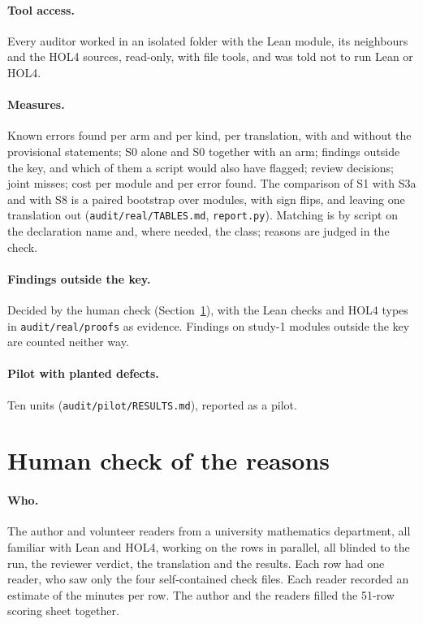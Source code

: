 \documentclass[11pt,a4paper]{article}
\newcommand{\code}[1]{\texttt{#1}}
\begin{document}
\paragraph{Tool access.} Every auditor worked in an isolated folder with the Lean module, its neighbours and the HOL4 sources, read-only, with file tools, and was told not to run Lean or HOL4.
\paragraph{Measures.} Known errors found per arm and per kind, per translation, with and without the provisional statements; S0 alone and S0 together with an arm; findings outside the key, and which of them a script would also have flagged; review decisions; joint misses; cost per module and per error found. The comparison of S1 with S3a and with S8 is a paired bootstrap over modules, with sign flips, and leaving one translation out (\code{audit/real/TABLES.md}, \code{report.py}). Matching is by script on the declaration name and, where needed, the class; reasons are judged in the check.
\paragraph{Findings outside the key.} Decided by the human check (Section~\ref{sec:check}), with the Lean checks and HOL4 types in \code{audit/real/proofs} as evidence. Findings on study-1 modules outside the key are counted neither way.
\paragraph{Pilot with planted defects.} Ten units (\code{audit/pilot/RESULTS.md}), reported as a pilot.

\section{Human check of the reasons}\label{sec:check}
\paragraph{Who.} The author and volunteer readers from a university mathematics department, all familiar with Lean and HOL4, working on the rows in parallel, all blinded to the run, the reviewer verdict, the translation and the results. Each row had one reader, who saw only the four self-contained check files. Each reader recorded an estimate of the minutes per row. The author and the readers filled the 51-row scoring sheet together.
\end{document}
